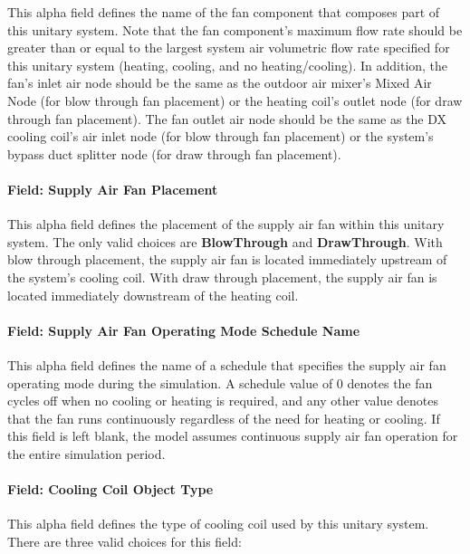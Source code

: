 This alpha field defines the name of the fan component that composes part of this unitary system. Note that the fan component's maximum flow rate should be greater than or equal to the largest system air volumetric flow rate specified for this unitary system (heating, cooling, and no heating/cooling). In addition, the fan's inlet air node should be the same as the outdoor air mixer's Mixed Air Node (for blow through fan placement) or the heating coil's outlet node (for draw through fan placement). The fan outlet air node should be the same as the DX cooling coil's air inlet node (for blow through fan placement) or the system's bypass duct splitter node (for draw through fan placement).

\paragraph{Field: Supply Air Fan Placement}\label{field-supply-air-fan-placement-1}

This alpha field defines the placement of the supply air fan within this unitary system. The only valid choices are \textbf{BlowThrough} and \textbf{DrawThrough}. With blow through placement, the supply air fan is located immediately upstream of the system's cooling coil. With draw through placement, the supply air fan is located immediately downstream of the heating coil.

\paragraph{Field: Supply Air Fan Operating Mode Schedule Name}\label{field-supply-air-fan-operating-mode-schedule-name-3}

This alpha field defines the name of a schedule that specifies the supply air fan operating mode during the simulation. A schedule value of 0 denotes the fan cycles off when no cooling or heating is required, and any other value denotes that the fan runs continuously regardless of the need for heating or cooling. If this field is left blank, the model assumes continuous supply air fan operation for the entire simulation period.

\paragraph{Field: Cooling Coil Object Type}\label{field-cooling-coil-object-type-6}

This alpha field defines the type of cooling coil used by this unitary system. There are three valid choices for this field:


